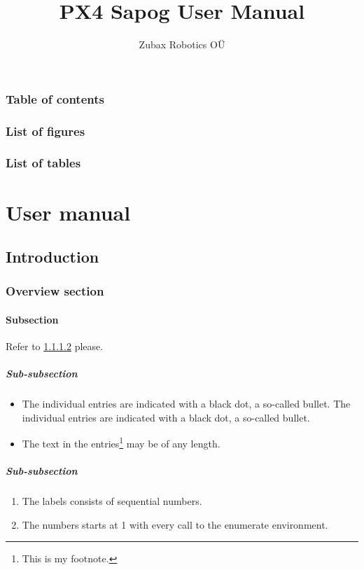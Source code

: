\documentclass[a4paper,onecolumn,openany]{book}
\author{Zubax Robotics O\"U}
\title{PX4 Sapog User Manual}
\makeatletter
\renewcommand{\contentsname}{Table of contents}
\renewcommand{\listfigurename}{List of figures}
\renewcommand{\listtablename}{List of tables}
\renewcommand\tableofcontents{%
    \thispagestyle{plain}
    \section*{\contentsname}%
    \@starttoc{toc}%
    }
\renewcommand\listoffigures{%
    \thispagestyle{plain}
    \section*{\listfigurename}%
    \@starttoc{lof}%
    }
\renewcommand\listoftables{%
    \thispagestyle{plain}
    \section*{\listtablename}%
    \@starttoc{lot}%
    }
\makeatother
\begin{document}
\frontmatter

\maketitle
\tableofcontents
\listoffigures
\listoftables

\mainmatter

\part{User manual}

\chapter{Introduction}

\section{Overview section}

\subsection{Subsection}

Refer to \ref{sec:subsubsection} please.

\lipsum[1]

\subsubsection{Sub-subsection}

\begin{itemize}
  \item The individual entries are indicated with a black dot, a so-called bullet.
The individual entries are indicated with a black dot, a so-called bullet.
  \item The text in the entries\footnote{This is my footnote.} may be of any length.
\end{itemize}

\lipsum[2]

\subsubsection{Sub-subsection}

\label{sec:subsubsection}
\begin{enumerate}
  \item The labels consists of sequential numbers.
  \item The numbers starts at 1 with every call to the enumerate environment.
\end{enumerate}
\end{document}

